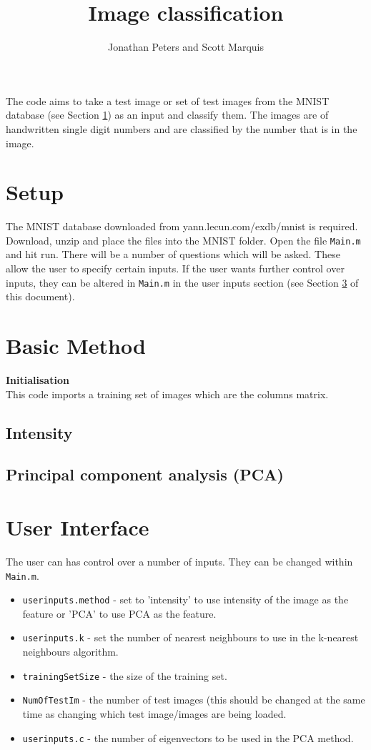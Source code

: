\documentclass[10pt]{article}
\title{Image classification}
\author{Jonathan Peters and Scott Marquis}
\date{}
\begin{document}
 

\maketitle

The code aims to take a test image or set of test images from the MNIST database (see Section \ref{Setup}) as an input and classify them. The images are of handwritten single digit numbers and are classified by the number that is in the image. 

\section{Setup} \label{Setup}
The MNIST database downloaded from yann.lecun.com/exdb/mnist is required. Download, unzip and place the files into the MNIST folder. Open the file {\tt Main.m} and hit run. There will be a number of questions which will be asked. These allow the user to specify certain inputs. If the user wants further control over inputs, they can be altered in {\tt Main.m} in the user inputs section (see Section \ref{User} of this document). 

\section{Basic Method}
{\bf Initialisation} \\
This code imports a training set of images which are the columns matrix.  

\subsection{Intensity} 

\subsection{Principal component analysis (PCA)}

\section{User Interface}\label{User}
The user can has control over a number of inputs. They can be changed within {\tt Main.m}.  
\begin{itemize}
\setlength\itemsep{0 cm}
\item {\tt userinputs.method} - set to 'intensity' to use intensity of the image as the feature or 'PCA' to use PCA as the feature. 
\item {\tt userinputs.k} - set the number of nearest neighbours to use in the k-nearest neighbours algorithm.  
\item {\tt trainingSetSize} - the size of the training set.
\item {\tt NumOfTestIm} - the number of test images (this should be changed at the same time as changing which test image/images are being loaded.
\item {\tt userinputs.c} - the number of eigenvectors to be used in the PCA method. 
\end{itemize}
\end{document}
